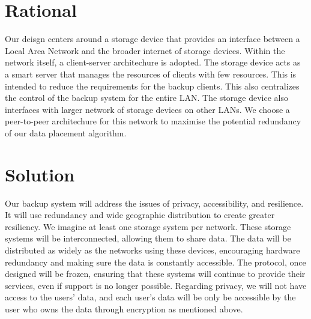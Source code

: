 \section{Rational}

Our deisgn centers around a storage device that provides an interface between a Local Area Network and the broader internet of storage devices. Within the network itself, a client-server architechure is adopted. The storage device acts as a smart server that manages the resources of clients with few resources. This is intended to reduce the requirements for the backup clients. This also centralizes the control of the backup system for the entire LAN. The storage device also interfaces with larger network of storage devices on other LANs. We choose a peer-to-peer architechure for this network to maximise the potential redundancy of our data placement algorithm.
\section{Solution}

Our backup system will address the issues of privacy, accessibility, and resilience. It will use redundancy and wide geographic distribution to create greater resiliency. We imagine at least one storage system per network. These storage systems will be interconnected, allowing them to share data. The data will be distributed as widely as the networks using these devices, encouraging hardware redundancy and making sure the data is constantly accessible. The protocol, once designed will be frozen, ensuring that these systems will continue to provide their services, even if support is no longer possible. Regarding privacy, we will not have access to the users' data, and each user's data will be only be accessible by the user who owns the data through encryption as mentioned above.
